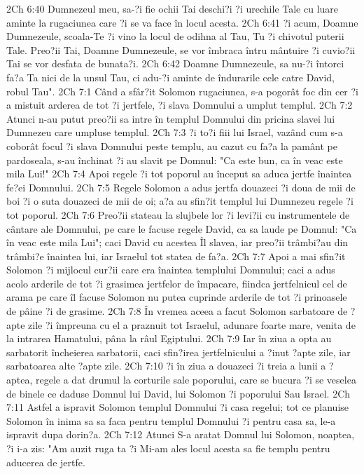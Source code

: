 2Ch 6:40  Dumnezeul meu, sa-?i fie ochii Tai deschi?i ?i urechile Tale cu luare aminte la rugaciunea care ?i se va face în locul acesta.
2Ch 6:41  ?i acum, Doamne Dumnezeule, scoala-Te ?i vino la locul de odihna al Tau, Tu ?i chivotul puterii Tale. Preo?ii Tai, Doamne Dumnezeule, se vor îmbraca întru mântuire ?i cuvio?ii Tai se vor desfata de bunata?i.
2Ch 6:42  Doamne Dumnezeule, sa nu-?i întorci fa?a Ta nici de la unsul Tau, ci adu-?i aminte de îndurarile cele catre David, robul Tau".
2Ch 7:1  Când a sfâr?it Solomon rugaciunea, s-a pogorât foc din cer ?i a mistuit arderea de tot ?i jertfele, ?i slava Domnului a umplut templul.
2Ch 7:2  Atunci n-au putut preo?ii sa intre în templul Domnului din pricina slavei lui Dumnezeu care umpluse templul.
2Ch 7:3  ?i to?i fiii lui Israel, vazând cum s-a coborât focul ?i slava Domnului peste templu, au cazut cu fa?a la pamânt pe pardoseala, s-au închinat ?i au slavit pe Domnul: "Ca este bun, ca în veac este mila Lui!"
2Ch 7:4  Apoi regele ?i tot poporul au început sa aduca jertfe înaintea fe?ei Domnului.
2Ch 7:5  Regele Solomon a adus jertfa douazeci ?i doua de mii de boi ?i o suta douazeci de mii de oi; a?a au sfin?it templul lui Dumnezeu regele ?i tot poporul.
2Ch 7:6  Preo?ii stateau la slujbele lor ?i levi?ii cu instrumentele de cântare ale Domnului, pe care le facuse regele David, ca sa laude pe Domnul: "Ca în veac este mila Lui"; caci David cu acestea Îl slavea, iar preo?ii trâmbi?au din trâmbi?e înaintea lui, iar Israelul tot statea de fa?a.
2Ch 7:7  Apoi a mai sfin?it Solomon ?i mijlocul cur?ii care era înaintea templului Domnului; caci a adus acolo arderile de tot ?i grasimea jertfelor de împacare, fiindca jertfelnicul cel de arama pe care îl facuse Solomon nu putea cuprinde arderile de tot ?i prinoasele de pâine ?i de grasime.
2Ch 7:8  În vremea aceea a facut Solomon sarbatoare de ?apte zile ?i împreuna cu el a praznuit tot Israelul, adunare foarte mare, venita de la intrarea Hamatului, pâna la râul Egiptului.
2Ch 7:9  Iar în ziua a opta au sarbatorit încheierea sarbatorii, caci sfin?irea jertfelnicului a ?inut ?apte zile, iar sarbatoarea alte ?apte zile.
2Ch 7:10  ?i în ziua a douazeci ?i treia a lunii a ?aptea, regele a dat drumul la corturile sale poporului, care se bucura ?i se veselea de binele ce daduse Domnul lui David, lui Solomon ?i poporului Sau Israel.
2Ch 7:11  Astfel a ispravit Solomon templul Domnului ?i casa regelui; tot ce planuise Solomon în inima sa sa faca pentru templul Domnului ?i pentru casa sa, le-a ispravit dupa dorin?a.
2Ch 7:12  Atunci S-a aratat Domnul lui Solomon, noaptea, ?i i-a zis: "Am auzit ruga ta ?i Mi-am ales locul acesta sa fie templu pentru aducerea de jertfe.
